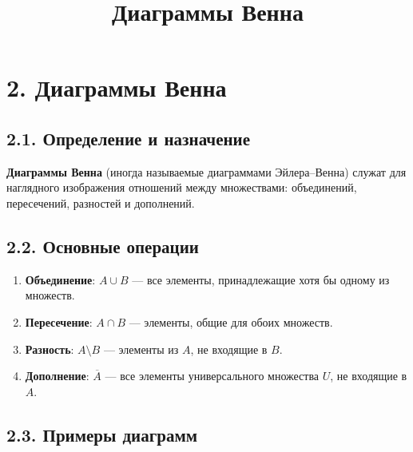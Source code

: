 \documentclass{article}
\begin{document}
\title{Диаграммы Венна}
\author{}
\date{}
\makeatletter
\renewcommand{\maketitle}{
  \begin{center}
    {\Large\mdseries\@title\par}
    \vspace{0.5em}
  \end{center}
}
\makeatother
\maketitle

\section*{2. Диаграммы Венна}

\subsection*{2.1. Определение и назначение}

\textbf{Диаграммы Венна} (иногда называемые диаграммами Эйлера–Венна) служат для наглядного изображения отношений между множествами: объединений, пересечений, разностей и дополнений.

\subsection*{2.2. Основные операции}

\begin{enumerate}[label=\arabic*)]
  \item \textbf{Объединение}: \(A \cup B\) — все элементы, принадлежащие хотя бы одному из множеств.
  \item \textbf{Пересечение}: \(A \cap B\) — элементы, общие для обоих множеств.
  \item \textbf{Разность}: \(A \setminus B\) — элементы из \(A\), не входящие в \(B\).
  \item \textbf{Дополнение}: \(\overline{A}\) — все элементы универсального множества \(U\), не входящие в \(A\).
\end{enumerate}

\subsection*{2.3. Примеры диаграмм}
\end{document}
